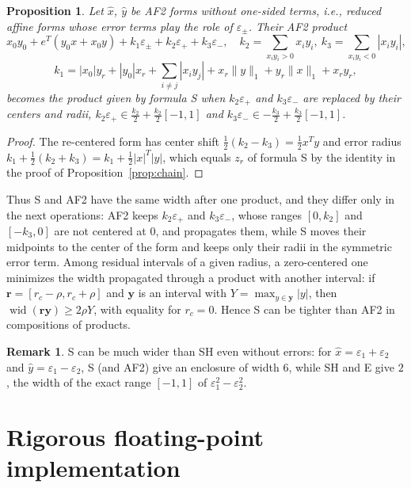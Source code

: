 \documentclass[11pt]{article}
\newtheorem{propo}{Proposition}
\theoremstyle{definition}
\newtheorem{remark}{Remark}
\newcommand{\eps}{\varepsilon}
\newcommand{\wid}{\operatorname{wid}}
\begin{document}
\begin{propo}
\label{prop:af2}
Let $\hat x$, $\hat y$ be AF2 forms without one-sided terms, i.e., reduced affine forms whose error terms play the role of $\eps_\pm$. Their AF2 product~\cite{messine2002extentions}
\[
x_0y_0 + e^T(y_0x+x_0y) + k_1\eps_\pm + k_2\eps_+ + k_3\eps_-,\quad k_2=\sum_{x_iy_i>0}x_iy_i,\ k_3=\sum_{x_iy_i<0}|x_iy_i|,
\]
\[
k_1 = |x_0|y_r+|y_0|x_r+\sum_{i\ne j}|x_iy_j| + x_r\|y\|_1+y_r\|x\|_1+x_ry_r,
\]
becomes the product given by formula S when $k_2\eps_+$ and $k_3\eps_-$ are replaced by their centers and radii, $k_2\eps_+\in \tfrac{k_2}{2}+\tfrac{k_2}{2}[-1,1]$ and $k_3\eps_-\in-\tfrac{k_3}{2}+\tfrac{k_3}{2}[-1,1]$.
\end{propo}
\begin{proof}
The re-centered form has center shift $\tfrac12(k_2-k_3)=\tfrac12x^Ty$ and error radius $k_1+\tfrac12(k_2+k_3) = k_1+\tfrac12|x|^T|y|$, which equals $z_r$ of formula S by the identity in the proof of Proposition~\ref{prop:chain}.
\end{proof}

Thus S and AF2 have the same width after one product, and they differ only in the next operations: AF2 keeps $k_2\eps_+$ and $k_3\eps_-$, whose ranges $[0,k_2]$ and $[-k_3,0]$ are not centered at $0$, and propagates them, while S moves their midpoints to the center of the form and keeps only their radii in the symmetric error term. Among residual intervals of a given radius, a zero-centered one minimizes the width propagated through a product with another interval: if $\mathbf r=[r_c-\rho,r_c+\rho]$ and $\mathbf y$ is an interval with $Y=\max_{y\in\mathbf y}|y|$, then $\wid(\mathbf r\mathbf y)\ge 2\rho Y$, with equality for $r_c=0$. Hence S can be tighter than AF2 in compositions of products.

\begin{remark}
S can be much wider than SH even without errors: for $\hat x=\eps_1+\eps_2$ and $\hat y=\eps_1-\eps_2$, S (and AF2) give an enclosure of width $6$, while SH and E give $2$, the width of the exact range $[-1,1]$ of $\eps_1^2-\eps_2^2$.
\end{remark}

\section{Rigorous floating-point implementation}
\label{sec:rigor}
\end{document}
